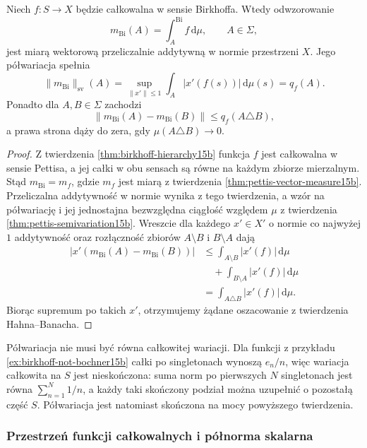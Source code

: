 \begin{twierdzenie}
\label{thm:birkhoff-vector-measure15b}
Niech $f:S\to X$ będzie całkowalna w sensie Birkhoffa.
Wtedy odwzorowanie
\[
 m_{\mathrm{Bi}}(A)=\int_A^{\mathrm{Bi}}f\,\mathrm d\mu,
 \qquad A\in\Sigma,
\]
jest miarą wektorową przeliczalnie addytywną w normie
przestrzeni $X$. Jego półwariacja spełnia
\[
 \|m_{\mathrm{Bi}}\|_{\mathrm{sv}}(A)
 =\sup_{\|x'\|\le1}\int_A|x'(f(s))|\,\mathrm d\mu(s)
 =q_f(A).
\]
Ponadto dla $A,B\in\Sigma$ zachodzi
\[
 \|m_{\mathrm{Bi}}(A)-m_{\mathrm{Bi}}(B)\|
 \le q_f(A\triangle B),
\]
a prawa strona dąży do zera, gdy $\mu(A\triangle B)\to0$.
\end{twierdzenie}
\begin{proof}
Z twierdzenia \ref{thm:birkhoff-hierarchy15b} funkcja $f$
jest całkowalna w sensie Pettisa, a jej całki w obu
sensach są równe na każdym zbiorze mierzalnym.
Stąd $m_{\mathrm{Bi}}=m_f$, gdzie $m_f$ jest miarą
z twierdzenia \ref{thm:pettis-vector-measure15b}.
Przeliczalna addytywność w normie wynika z tego
twierdzenia, a wzór na półwariację i jej jednostajna
bezwzględna ciągłość względem $\mu$ z twierdzenia
\ref{thm:pettis-semivariation15b}.
Wreszcie dla każdego $x'\in X'$ o normie co najwyżej $1$
addytywność oraz rozłączność zbiorów $A\setminus B$
i $B\setminus A$ dają
\[
 \begin{aligned}
 |x'(m_{\mathrm{Bi}}(A)-m_{\mathrm{Bi}}(B))|
 &\le\int_{A\setminus B}|x'(f)|\,\mathrm d\mu\\
 &\quad+\int_{B\setminus A}|x'(f)|\,\mathrm d\mu\\
 &=\int_{A\triangle B}|x'(f)|\,\mathrm d\mu.
 \end{aligned}
\]
Biorąc supremum po takich $x'$, otrzymujemy żądane
oszacowanie z twierdzenia Hahna--Banacha.
\end{proof}

Półwariacja nie musi być równa całkowitej wariacji.
Dla funkcji z przykładu \ref{ex:birkhoff-not-bochner15b}
całki po singletonach wynoszą $e_n/n$, więc wariacja
całkowita na $S$ jest nieskończona: suma norm po
pierwszych $N$ singletonach jest równa
$\sum_{n=1}^N1/n$, a każdy taki skończony podział można
uzupełnić o pozostałą część $S$.
Półwariacja jest natomiast skończona na mocy
powyższego twierdzenia.

\subsubsection{Przestrzeń funkcji całkowalnych i półnorma skalarna}


